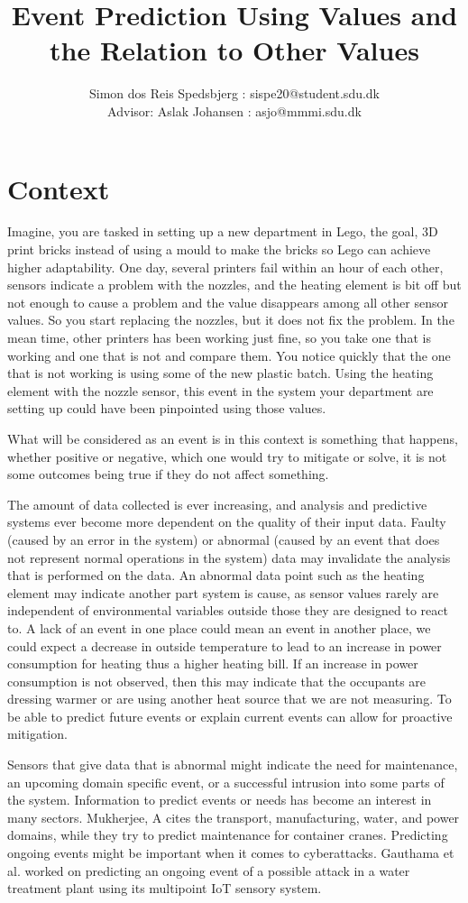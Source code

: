 \documentclass[a4paper,8pt]{article}
\title{Event Prediction Using Values and the Relation to Other Values}
\author{Simon dos Reis Spedsbjerg : sispe20@student.sdu.dk\\ {\small Advisor: Aslak Johansen : asjo@mmmi.sdu.dk}}
\begin{document}
	\maketitle
	\section{Context}
		Imagine, you are tasked in setting up a new department in Lego, the goal, 3D print bricks instead of using a mould to make the bricks so Lego can achieve higher adaptability. One day, several printers fail within an hour of each other, sensors indicate a problem with the nozzles, and the heating element is bit off but not enough to cause a problem and the value disappears among all other sensor values. So you start replacing the nozzles, but it does not fix the problem. In the mean time, other printers has been working just fine, so you take one that is working and one that is not and compare them. You notice quickly that the one that is not working is using some of the new plastic batch. Using the heating element with the nozzle sensor, this event in the system your department are setting up could have been pinpointed using those values.
		
		What will be considered as an event is in this context is something that happens, whether positive or negative, which one would try to mitigate or solve, it is not some outcomes being true if they do not affect something.
		
		The amount of data collected is ever increasing, and analysis and predictive systems ever become more dependent on the quality of their input data. Faulty (caused by an error in the system) or abnormal (caused by an event that does not represent normal operations in the system) data may invalidate the analysis that is performed on the data. An abnormal data point such as the heating element may indicate another part system is cause, as sensor values rarely are independent of environmental variables outside those they are designed to react to. A lack of an event in one place could mean an event in another place, we could expect a decrease in outside temperature to lead to an increase in power consumption for heating thus a higher heating bill. If an increase in power consumption is not observed, then this may indicate that the occupants are dressing warmer or are using another heat source that we are not measuring. To be able to predict future events or explain current events can allow for proactive mitigation. 
		
		Sensors that give data that is abnormal might indicate the need for maintenance\cite{MUKHERJEE2024102444}, an upcoming domain specific event, or a successful intrusion into some parts of the system\cite{MR2022103046}. Information to predict events or needs has become an interest in many sectors. Mukherjee, A\cite{MUKHERJEE2024102444} cites the transport, manufacturing, water, and power domains, while they try to predict maintenance for container cranes. Predicting ongoing events might be important when it comes to cyberattacks. Gauthama et al. worked on predicting an ongoing event of a possible attack in a water treatment plant using its multipoint IoT sensory system\cite{MR2022103046}.
		
\end{document}
